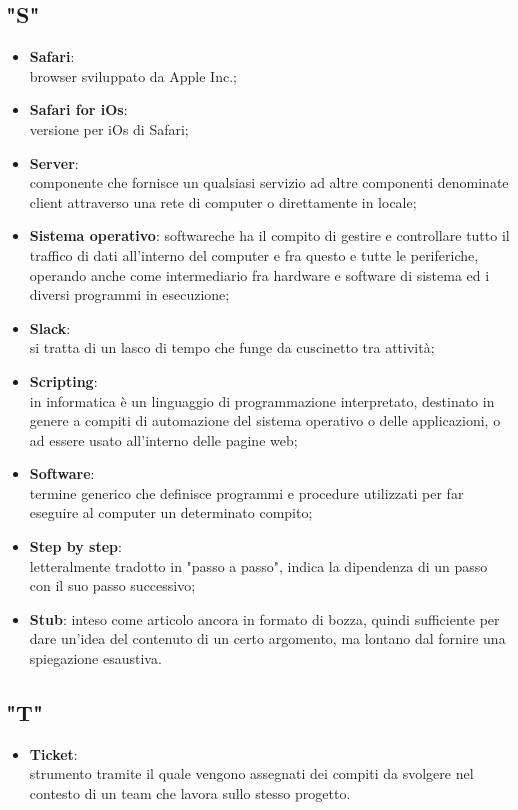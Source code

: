 \subsection*{"S"}
\begin{itemize}
\itemsep2em
\item \textbf{Safari}:\\ browser sviluppato da Apple Inc.;
\item \textbf{Safari for iOs}:\\ versione per iOs di Safari;
\item \textbf{Server}:\\ componente che fornisce un qualsiasi servizio ad altre componenti denominate client attraverso una rete di computer o direttamente in locale;
\item \textbf{Sistema operativo}: software\ped che ha il compito di gestire e controllare tutto il traffico di dati all’interno del computer e fra questo e tutte le periferiche, operando anche come intermediario fra hardware e software di sistema ed i diversi programmi in esecuzione;
\item \textbf{Slack}:\\ si tratta di un lasco di tempo che funge da cuscinetto tra attività;
\item \textbf{Scripting}:\\ in informatica è un linguaggio di programmazione interpretato, destinato in genere a compiti di automazione del sistema operativo o delle applicazioni, o ad essere usato all'interno delle pagine web;
\item \textbf{Software}:\\ termine generico che definisce programmi e procedure utilizzati per far eseguire al computer un determinato compito;
\item \textbf{Step by step}:\\ letteralmente tradotto in "passo a passo", indica la dipendenza di un passo con il suo passo successivo;
\item \textbf{Stub}: inteso come articolo ancora in formato di bozza, quindi sufficiente per dare un'idea del contenuto di un certo argomento, ma lontano dal fornire una spiegazione esaustiva.
\end{itemize} 

\subsection*{"T"}
\begin{itemize}
\itemsep2em
\item \textbf{Ticket}:\\ strumento tramite il quale vengono assegnati dei compiti da svolgere nel contesto di un team che lavora sullo stesso progetto.
\end{itemize}

